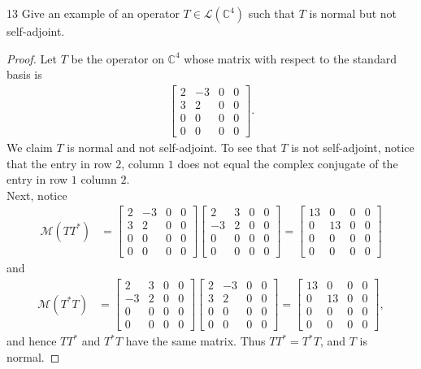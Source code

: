 \documentclass{extarticle}
\newenvironment{problem}[1]{\begin{prob*}{#1}{}}{\end{prob*}}
\newcommand{\C}{\mathbb{C}}
\newcommand{\mat}{\mathcal{M}}
\newcommand{\Hom}{\mathcal{L}}
\begin{document}
\begin{problem}{13}
Give an example of an operator $T\in\Hom(\C^4)$ such that $T$ is normal but not self-adjoint.
\end{problem}
\begin{proof}
Let $T$ be the operator on $\C^4$ whose matrix with respect to the standard basis is
\begin{align*}
\begin{bmatrix}
2 & -3 & 0 & 0\\
3 &  2 & 0 & 0\\
0 &  0 & 0 & 0\\
0 &  0 & 0 & 0
\end{bmatrix}.
\end{align*} 
We claim $T$ is normal and not self-adjoint.  To see that $T$ is not self-adjoint, notice that the entry in row $2$, column $1$ does not equal the complex conjugate of the entry in row $1$ column $2$.\\
\indent Next, notice
\begin{align*}
\mat(TT^\ast) &= 
\begin{bmatrix}
2 & -3 & 0 & 0\\
3 &  2 & 0 & 0\\
0 &  0 & 0 & 0\\
0 &  0 & 0 & 0
\end{bmatrix}
\begin{bmatrix}
2  & 3 & 0 & 0\\
-3 & 2 & 0 & 0\\
0  & 0 & 0 & 0\\
0  & 0 & 0 & 0
\end{bmatrix}
= 
\begin{bmatrix}
13  & 0 & 0 & 0\\
0 & 13 & 0 & 0\\
0  & 0 & 0 & 0\\
0  & 0 & 0 & 0
\end{bmatrix}
\end{align*}
and 
\begin{align*}
\mat(T^\ast T) &= 
\begin{bmatrix}
2 & 3 & 0 & 0\\
-3 &  2 & 0 & 0\\
0 &  0 & 0 & 0\\
0 &  0 & 0 & 0
\end{bmatrix}
\begin{bmatrix}
2  & -3 & 0 & 0\\
3 & 2 & 0 & 0\\
0  & 0 & 0 & 0\\
0  & 0 & 0 & 0
\end{bmatrix}
= 
\begin{bmatrix}
13  & 0 & 0 & 0\\
0 & 13 & 0 & 0\\
0  & 0 & 0 & 0\\
0  & 0 & 0 & 0
\end{bmatrix},
\end{align*}
and hence $TT^\ast$ and $T^\ast T$ have the same matrix.  Thus $TT^\ast = T^\ast T$, and $T$ is normal.   
\end{proof}
\end{document}
